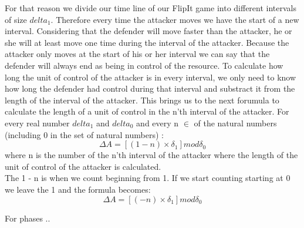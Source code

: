 For that reason we divide our time line of our FlipIt game into different intervals of size $delta_{1}$. Therefore every time the attacker moves we have the start of a new interval. Considering that the defender will move faster than the attacker, he or she will at least move one time during the interval of the attacker. Because the attacker only moves at the start of his or her interval we can say that the defender will always end as being in control of the resource. To calculate how long the unit of control of the attacker is in every interval, we only need to know how long the defender had control during that interval and substract it from the length of the interval of the attacker. 
This brings us to the next forumula to calculate the length of a unit of control in the n'th interval of the attacker. 
For every real number $delta_{1}$ and $delta_{0}$ and every n $\in$ of the natural numbers (including 0 in the set of natural numbers) :
\begin{equation}\label{first}
\Delta A = [( 1- n  ) \times \delta_{1}] mod \delta_{0}
\end{equation}
where n is the number of the n'th interval of the attacker where the length of the unit of control of the attacker is calculated.\\

The 1 - n is when we count beginning from 1. If we start counting starting at 0 we leave the 1 and the formula becomes:
\begin{equation}\label{first}
\Delta A = [( - n  ) \times \delta_{1}] mod \delta_{0}
\end{equation}


For phases ..

